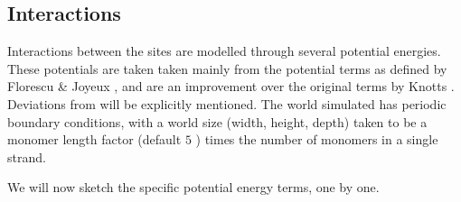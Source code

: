 \subsection{Interactions}

Interactions between the sites are modelled through several potential energies.
These potentials are taken taken mainly from the potential terms as defined by Florescu \& Joyeux \cite{florescu2011thermal}, and are an improvement over the original terms by Knotts \etal \cite{knotts2007coarse}. Deviations from \cite{florescu2011thermal} will be explicitly mentioned. The world simulated has periodic boundary conditions, with a world size (width, height, depth) taken to be a monomer length factor (default $5$ \Angstrom) times the number of monomers in a single strand.

We will now sketch the specific potential energy terms, one by one.





